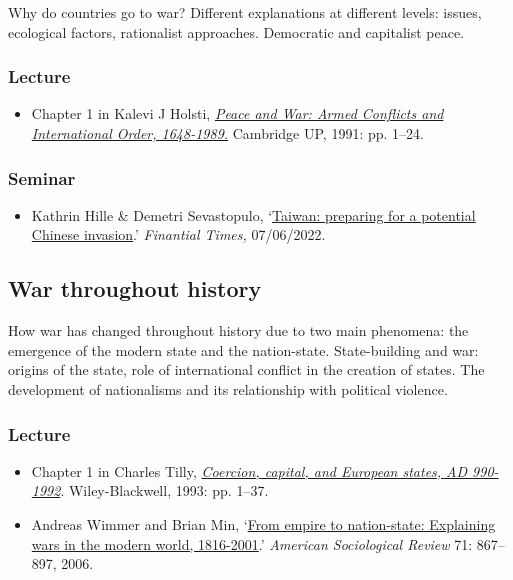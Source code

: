 \documentclass[12pt, a4paper]{article}
\begin{document}
Why do countries go to war? Different explanations at different levels: issues, ecological factors, rationalist approaches. Democratic and capitalist peace.

\subsubsection*{Lecture}

\begin{itemize}
\setlength\itemsep{0pt}
\item Chapter 1 in Kalevi J Holsti, \href{https://doi.org/10.1017/CBO9780511628290}{\textit{Peace and War: Armed Conflicts and International Order, 1648-1989.}} Cambridge UP, 1991: pp. 1--24.
\end{itemize}

\subsubsection*{Seminar}

\begin{itemize}
\setlength\itemsep{0pt}
\item Kathrin Hille \& Demetri Sevastopulo, `\href{https://www.ft.com/content/0850eb67-1700-47c0-9dbf-3395b4e905fd}{Taiwan: preparing for a potential Chinese invasion}.' \textit{Finantial Times,} 07/06/2022.
\end{itemize}

\hline %

\subsection{War throughout history}\label{war_history}

How war has changed throughout history due to two main phenomena: the emergence of the modern state and the nation-state. State-building and war: origins of the state, role of international conflict in the creation of states. The development of nationalisms and its relationship with political violence.

\subsubsection*{Lecture}

\begin{itemize}
\setlength\itemsep{0pt}
\item Chapter 1 in Charles Tilly, \href{https://www.wiley.com/en-us/Coercion%2C+Capital+and+European+States%2C+A+D+990+1992-p-9781557863683}{\textit{Coercion, capital, and European states, AD 990-1992}}. Wiley-Blackwell, 1993: pp. 1--37.
\item Andreas Wimmer and Brian Min, `\href{https://doi.org/10.1177/000312240607100601}{From empire to nation-state: Explaining wars in the modern world, 1816-2001}.' \textit{American Sociological Review} 71: 867--897, 2006.
\end{itemize}
\end{document}
